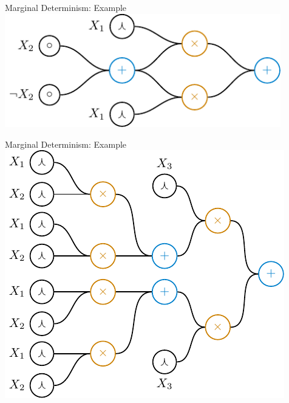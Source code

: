 \documentclass[aspectratio=169]{beamer}
\begin{document}
  \begin{frame}{Marginal Determinism: Example}
    \center
    \includegraphics[width=0.9\textwidth]{figures/example.pdf}
  \end{frame}
  \begin{frame}{Marginal Determinism: Example}
    \center
    \includegraphics[height=0.8\textheight]{figures/big-example.pdf}
  \end{frame}
\end{document}
